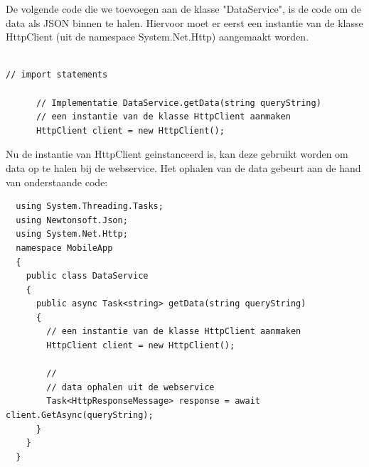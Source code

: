De volgende code die we toevoegen aan de klasse "DataService", is de code om de data als JSON binnen te halen.
Hiervoor moet er eerst een instantie van de klasse HttpClient (uit de namespace System.Net.Http) aangemaakt worden.
\begin{lstlisting}

// import statements

      // Implementatie DataService.getData(string queryString)
      // een instantie van de klasse HttpClient aanmaken
      HttpClient client = new HttpClient();

\end{lstlisting}
Nu de instantie van HttpClient geinstanceerd is, kan deze gebruikt worden om data op te halen bij de webservice.
Het ophalen van de data gebeurt aan de hand van onderstaande code:
\begin{lstlisting}
  using System.Threading.Tasks;
  using Newtonsoft.Json;
  using System.Net.Http;
  namespace MobileApp
  {
    public class DataService
    {
      public async Task<string> getData(string queryString)
      {
        // een instantie van de klasse HttpClient aanmaken
        HttpClient client = new HttpClient();

        //
        // data ophalen uit de webservice
        Task<HttpResponseMessage> response = await client.GetAsync(queryString);
      }
    }
  }
\end{lstlisting}

